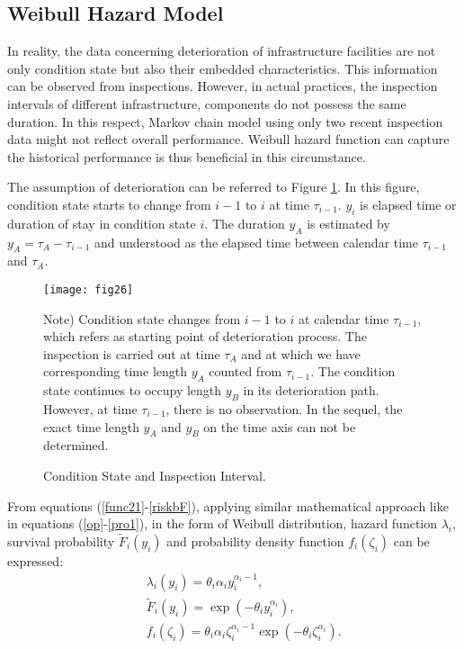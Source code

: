\subsection{Weibull Hazard Model}
\label{234}
In reality, the data concerning deterioration of infrastructure facilities are not only condition state but also their embedded characteristics. This information can be observed from inspections. However, in actual practices, the inspection intervals of different infrastructure, components do not possess the same duration. In this respect, Markov chain model using only two recent inspection data might not reflect overall performance. Weibull hazard function can capture the historical performance is thus beneficial in this circumstance. 

The assumption of deterioration can be referred to Figure \ref{fig26}. In this figure, condition state starts to change from $i-1$ to $i$ at time $\tau_{i-1}$. $y_i$ is elapsed time or duration of stay in condition state $i$. The duration $y_A$ is estimated by $y_A = \tau_A - \tau_{i-1}$ and understood as the elapsed time between calendar time $\tau_{i-1}$ and $\tau_A$.

\begin{figure}[t]
\begin{center}
\texttt{[image: fig26]} 
\end{center}
\footnotesize Note) Condition state changes from $i-1$ to $i$ at calendar time $\tau_{i-1}$, which refers as starting point of deterioration process. The inspection is carried out at time $\tau_A$ and at which we have corresponding time length $y_A$ counted from $\tau_{i-1}$. The condition state continues to occupy length $y_B$ in its deterioration path. However, at time $\tau_{i-1}$, there is no observation. In the sequel, the exact time length $y_A$ and $y_B$ on the time axis can not be determined.
\caption{Condition State and Inspection Interval.}
\label{fig26} 
\end{figure}
From equations (\ref{func21}-\ref{riskbF}), applying similar mathematical approach like in equations (\ref{op}-\ref{pro1}), in the form of Weibull distribution, hazard function $\lambda_i$, survival probability $\tilde{F} _ i(y_i)$ and probability density function $f_i(\zeta_i)$ can be expressed: 
\begin{eqnarray}
&& \lambda_i(y_i)= \theta_i \alpha_{i} y_i^{\alpha_{i}-1}, \label{hazardw}\\
&& \tilde{F}_i(y_i) = \exp (-\theta_i y_i^{\alpha_{i}}), \label{prop-bFlaw}\\
&& f_i(\zeta_i)=\theta_i \alpha_{i} \zeta^{\alpha_{i}-1}_i\exp(-\theta_i \zeta^{\alpha_{i}}_i).\label{kikanw}
\end{eqnarray}

